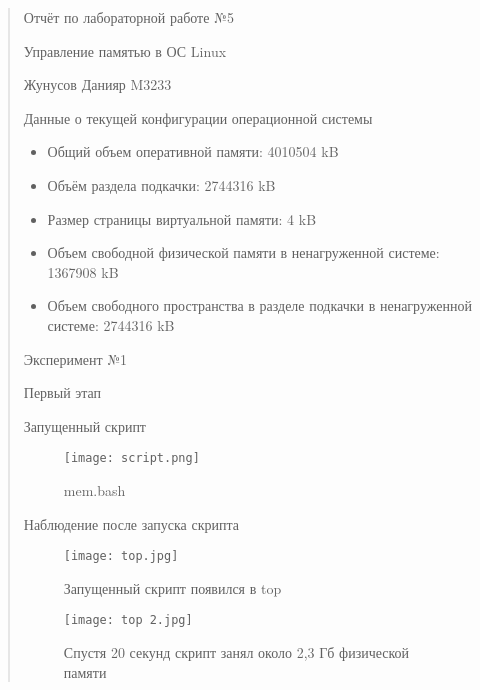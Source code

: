 \documentclass[12pt]{article}
\date{December 2024}
\begin{document}
\begin{quote}

\begin{center}
    \large Отчёт по лабораторной работе №5
\end{center}

\begin{center}
    \large Управление памятью в ОС Linux
\end{center}

\begin{center}
    \normalsize Жунусов Данияр M3233
\end{center}

Данные о текущей конфигурации операционной системы
\begin{itemize}
  \item Общий объем оперативной памяти: 4010504 kB
  \item Объём раздела подкачки: 2744316 kB
  \item Размер страницы виртуальной памяти: 4 kB
  \item Объем свободной физической памяти в ненагруженной системе: 1367908 kB
  \item Объем свободного пространства в разделе подкачки в ненагруженной системе: 2744316 kB
\end{itemize}

\begin{center}
    \normalsize Эксперимент №1 
\end{center}

\begin{center}
    \normalsize Первый этап
\end{center}

\begin{center}
    \normalsize Запущенный скрипт
\end{center}

\begin{figure}[h]
    \centering
    \texttt{[image: script.png]}
    \caption{mem.bash}
    \label{fig:example}
\end{figure}

Наблюдение после запуска скрипта

\begin{figure}[h]
    \centering
    \texttt{[image: top.jpg]}
    \caption{Запущенный скрипт появился в top}
    \label{fig:example}
\end{figure}

\begin{figure}[h]
    \centering
    \texttt{[image: top 2.jpg]}
    \caption{Спустя 20 секунд скрипт занял около 2,3 Гб физической памяти}
    \label{fig:example}
\end{figure}


\end{quote}
\end{document}
